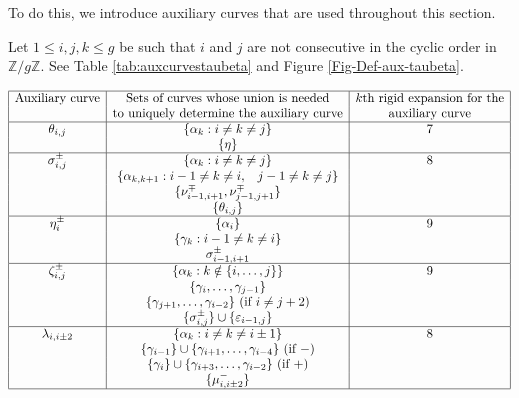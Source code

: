 \documentclass{artv3}
\newcommand*{\veps}{\varepsilon}
\newcommand{\Z}{\ensuremath{\mathbb{Z}}}
\begin{document}
To do this, we introduce auxiliary curves that are used throughout this section.

Let $1 \leq i,j,k \leq g$ be such that $i$ and $j$ are not consecutive in the cyclic order in $\Z / g \Z$. See Table \ref{tab:auxcurvestaubeta} and Figure \ref{Fig-Def-aux-taubeta}.

\begin{table}[]
    $$\begin{array}{|c|c|c|}\hline
   \text{Auxiliary curve} & \text{Sets of curves whose union is needed} & k \text{th rigid expansion for the} \\
   & \text{to uniquely determine the auxiliary curve} & \text{auxiliary curve} \\ \hline
   \theta_{i,j}  & \{\alpha_{k}: i \neq k \neq j\}& 7 \\
    & \{\eta\} & \\\hline
   \sigma_{i,j}^{\pm} & \{\alpha_{k}: i \neq k \neq j\} & 8 \\
    & \{\alpha_{k,k+1}: i-1\neq k \neq i, \hspace{3mm} j-1 \neq k \neq j \} & \\
    & \{\nu_{i-1,i+1}^{\mp}, \nu_{j-1,j+1}^{\mp}\} & \\
    & \{\theta_{i,j}\} & \\ \hline
   \eta_{i}^{\pm} & \{\alpha_{i}\} & 9 \\
    & \{\gamma_{k}: i-1 \neq k \neq i\} & \\
    & \sigma_{i-1,i+1}^{\pm} & \\\hline
   \zeta_{i,j}^{\pm} & \{\alpha_{k}: k \notin \{i, \ldots, j\}\} & 9 \\
    & \{\gamma_{i}, \ldots, \gamma_{j-1}\} & \\
    & \{\gamma_{j+1}, \ldots, \gamma_{i-2}\} \text{ (if $i \neq j+2$)} & \\
    & \{\sigma_{i,j}^{\pm}\} \cup \{\veps_{i-1,j}\} & \\ \hline
   \lambda_{i,i\pm2} & \{\alpha_k : i \neq k \neq i \pm 1\} & 8 \\
    & \{\gamma_{i-1}\} \cup \{\gamma_{i+1}, \ldots, \gamma_{i-4}\} \text{ (if $-$)} & \\
    & \{\gamma_{i}\} \cup \{\gamma_{i+3}, \ldots, \gamma_{i-2}\} \text{ (if $+$)} & \\
    & \{\mu_{i, i \pm 2}^{-}\} &
    \\ \hline
\end{array}$$
    \caption{Auxiliary curves used in this section, with all subindices modulo $g$.}
    \label{tab:auxcurvestaubeta}
\end{table}
\end{document}
